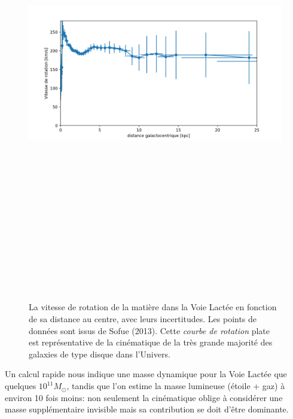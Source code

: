 \begin{figure}[htbp]
	\centering
		\includegraphics[height=20cm]{figs/rocurveMW.png}
	\caption{La vitesse de rotation de la matière dans la Voie Lactée en fonction de sa distance au centre, avec leurs incertitudes. Les points de données sont issus de Sofue (2013). Cette \textit{courbe de rotation} plate est représentative de la cinématique de la très grande majorité des galaxies de type disque dans l'Univers.} 
	\label{f:rotcurve}
\end{figure}

Un calcul rapide nous indique une masse dynamique pour la Voie Lactée que quelques $10^{11} M_\odot$, tandis que l'on estime la masse lumineuse (étoile + gaz) à environ 10 fois moins: non seulement la cinématique oblige à considérer une masse supplémentaire invisible mais sa contribution se doit d'être dominante.

